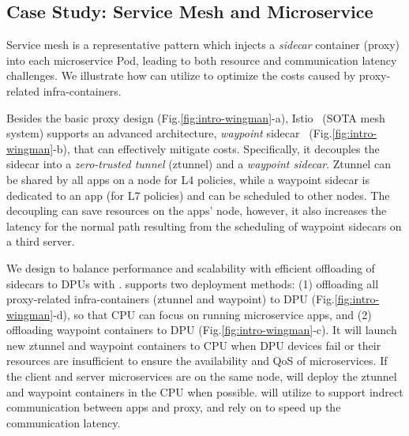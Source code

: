 \subsection{Case Study: Service Mesh and Microservice}
\label{s:case-mesh}

Service mesh is a representative pattern which injects a \emph{sidecar} container (proxy) into each microservice Pod, leading to both resource and communication latency challenges.
We illustrate how \sys can utilize \os to optimize the costs caused by proxy-related infra-containers.

Besides the basic proxy design (Fig.\ref{fig:intro-wingman}-a),
Istio~\cite{istio} (SOTA mesh system) supports an advanced architecture, \emph{waypoint} sidecar~\cite{istio-ambient} (Fig.\ref{fig:intro-wingman}-b), that can effectively mitigate costs.
Specifically, it decouples the sidecar into a \emph{zero-trusted tunnel} (ztunnel) and a \emph{waypoint sidecar}.
Ztunnel can be shared by all apps on a node for L4 policies, while a waypoint sidecar is dedicated to an app (for L7 policies) and can be scheduled to other nodes.
The decoupling can save resources on the apps' node, however, it also increases the latency for the normal path resulting from the scheduling of waypoint sidecars on a third server.


We design \mesh to balance performance and scalability with efficient offloading of sidecars to DPUs with \os.
\mesh supports two deployment methods:
(1) offloading all proxy-related infra-containers (ztunnel and waypoint) to DPU (Fig.\ref{fig:intro-wingman}-d), so that CPU can focus on running microservice apps,
and (2) offloading waypoint containers to DPU (Fig.\ref{fig:intro-wingman}-c).
It will launch new ztunnel and waypoint containers to CPU when DPU devices fail or their resources are insufficient to ensure the availability and QoS of microservices.
If the client and server microservices are on the same node, \mesh will deploy the ztunnel and waypoint containers in the CPU when possible.
\mesh will utilize \giptable to support indrect communication between apps and proxy, and rely on \gsocket to speed up the communication latency.

